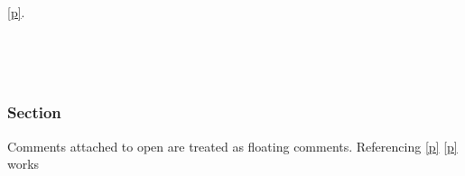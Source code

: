 \medbreak
\label{module-Toplevel+u+comments-module-Ref+u+in+u+synopsis}\begin{ocamlindent}\label{module-Toplevel+u+comments-module-Ref+u+in+u+synopsis-type-t}\\
\end{ocamlindent}%
\begin{ocamlindent}\hyperref[module-Toplevel+u+comments-module-Ref+u+in+u+synopsis-type-t]{[p\pageref*{module-Toplevel+u+comments-module-Ref+u+in+u+synopsis-type-t}]}.\end{ocamlindent}%
\medbreak
\label{module-Toplevel+u+comments-module-Comments+u+on+u+open}\begin{ocamlindent}\label{module-Toplevel+u+comments-module-Comments+u+on+u+open-module-M}\begin{ocamlindent}\label{module-Toplevel+u+comments-module-Comments+u+on+u+open-module-M-type-t}\\
\end{ocamlindent}%
\\
\subsubsection{Section\label{sec}}%
Comments attached to open are treated as floating comments. Referencing \hyperref[module-Toplevel+u+comments-module-Comments+u+on+u+open-sec]{[p\pageref*{module-Toplevel+u+comments-module-Comments+u+on+u+open-sec}]} \hyperref[module-Toplevel+u+comments-module-Comments+u+on+u+open-module-M-type-t]{[p\pageref*{module-Toplevel+u+comments-module-Comments+u+on+u+open-module-M-type-t}]} works

\end{ocamlindent}%
\\




